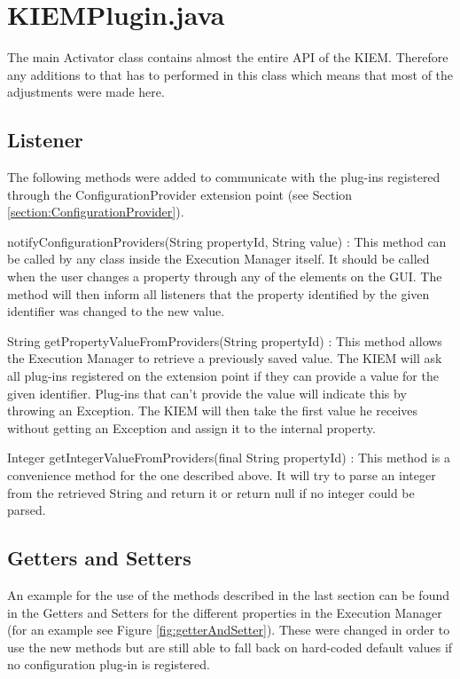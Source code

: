 \section{KIEMPlugin.java}
\label{section:ConfChangesKiemPlugin}
The main Activator class contains almost the entire \ac{API} of the \ac{KIEM}.
Therefore any additions to that has to performed in this class which means that
most of the adjustments were made here.

\subsection{Listener}
The following methods were added to communicate with the plug-ins registered through
the ConfigurationProvider extension point (see Section \ref{section:ConfigurationProvider}).
\begin{description}
 \item {notifyConfigurationProviders(String propertyId, String value)} : This method can be called by any class
inside the Execution Manager itself. It should be called when the user changes a property through any of
the elements on the \ac{GUI}. The method will then inform all listeners that the property identified by the
given identifier was changed to the new value.
 \item {String getPropertyValueFromProviders(String propertyId)} : This method allows the Execution Manager to
retrieve a previously saved value. The \ac{KIEM} will ask all plug-ins registered on the extension point if they
can provide a value for the given identifier. Plug-ins that can't provide the value will indicate this by throwing
an Exception. The \ac{KIEM} will then take the first value he receives without getting an Exception and assign it
to the internal property.
 \item {Integer getIntegerValueFromProviders(final String propertyId)} : This method is a convenience method for
the one described above. It will try to parse an integer from the retrieved String and return it or return null
if no integer could be parsed.
\end{description}

\subsection{Getters and Setters}
An example for the use of the methods described in the last section can be found in the Getters and Setters for
the different properties in the Execution Manager (for an example see Figure \ref{fig:getterAndSetter}). 
These were changed in order to use the new methods but are
still able to fall back on hard-coded default values if no configuration plug-in is registered.


